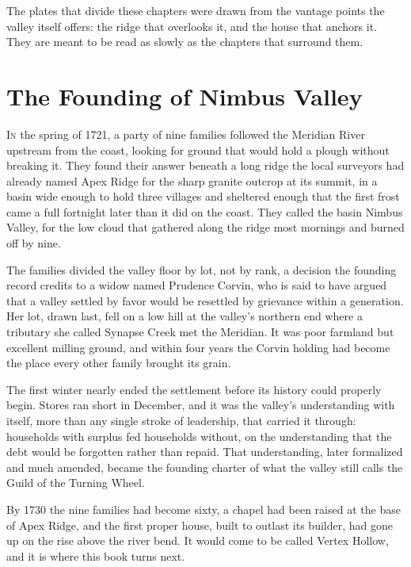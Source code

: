 \documentclass[11pt,twoside]{book}
\begin{document}
\vspace{8pt}
\noindent The plates that divide these chapters were drawn from the vantage points the valley itself offers: the ridge that overlooks it, and the house that anchors it. They are meant to be read as slowly as the chapters that surround them.

\tableofcontents

\mainmatter

\chapter{The Founding of Nimbus Valley}

\lettrine[lines=3,loversize=0.12]{\textcolor{heritageGreen}{I}}{n} the spring of 1721, a party of nine families followed the Meridian River upstream from the coast, looking for ground that would hold a plough without breaking it. They found their answer beneath a long ridge the local surveyors had already named Apex Ridge for the sharp granite outcrop at its summit, in a basin wide enough to hold three villages and sheltered enough that the first frost came a full fortnight later than it did on the coast. They called the basin Nimbus Valley, for the low cloud that gathered along the ridge most mornings and burned off by nine.

The families divided the valley floor by lot, not by rank, a decision the founding record credits to a widow named Prudence Corvin, who is said to have argued that a valley settled by favor would be resettled by grievance within a generation. Her lot, drawn last, fell on a low hill at the valley's northern end where a tributary she called Synapse Creek met the Meridian. It was poor farmland but excellent milling ground, and within four years the Corvin holding had become the place every other family brought its grain.

The first winter nearly ended the settlement before its history could properly begin. Stores ran short in December, and it was the valley's understanding with itself, more than any single stroke of leadership, that carried it through: households with surplus fed households without, on the understanding that the debt would be forgotten rather than repaid. That understanding, later formalized and much amended, became the founding charter of what the valley still calls the Guild of the Turning Wheel.

By 1730 the nine families had become sixty, a chapel had been raised at the base of Apex Ridge, and the first proper house, built to outlast its builder, had gone up on the rise above the river bend. It would come to be called Vertex Hollow, and it is where this book turns next.
\end{document}
